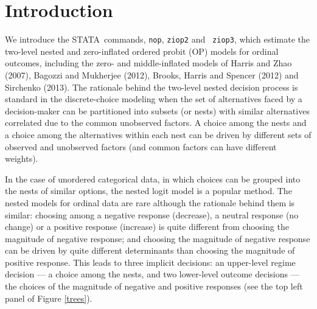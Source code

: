\documentclass[letterpaper,fleqn,12pt]{article}
\begin{document}
\section{Introduction}

We introduce the STATA\ commands, \texttt{nop}, \texttt{ziop2} and \texttt{%
ziop3}, which estimate the two-level nested and zero-inflated ordered probit
(OP) models for ordinal outcomes, including the zero- and middle-inflated
models of Harris and Zhao (2007), Bagozzi and Mukherjee (2012), Brooks,
Harris and Spencer (2012) and Sirchenko (2013). The rationale behind the
two-level nested decision process is standard in the discrete-choice
modeling when the set of alternatives faced by a decision-maker can be
partitioned into subsets (or nests) with similar alternatives correlated due
to the common unobserved factors. A choice among the nests and a choice
among the alternatives within each nest can be driven by different sets of
observed and unobserved factors (and common factors can have different
weights).

In the case of unordered categorical data, in which choices can be grouped
into the nests of similar options, the nested logit model is a popular
method. The nested models for ordinal data are rare although the rationale
behind them is similar: choosing among a negative response (decrease), a
neutral response (no change) or a positive response (increase) is quite
different from choosing the magnitude of negative response; and choosing the
magnitude of negative response can be driven by quite different determinants
than choosing the magnitude of positive response. This leads to three
implicit decisions: an upper-level regime decision --- a choice among the
nests, and two lower-level outcome decisions --- the choices of the
magnitude of negative and positive responses (see the top left panel of
Figure \ref{trees}).

\medskip \medskip
\end{document}
